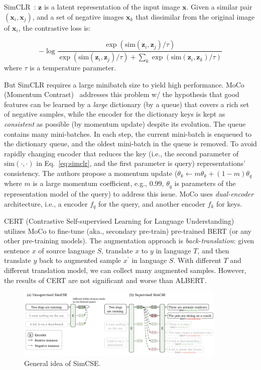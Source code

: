 SimCLR~: $\boldsymbol{z}$ is a latent representation of the input image $\boldsymbol{x}$. Given a similar pair $(\boldsymbol{x}_i, \boldsymbol{x}_j)$, and a set of negative images $\boldsymbol{x}_k$ that dissimilar from the original image of $\boldsymbol{x}_i$, the contrastive loss is:

\begin{equation} \label{eq:simclr}
	- \log \frac{\exp(\text{sim}(\boldsymbol{z}_i, \boldsymbol{z}_j)/\tau)}{\exp(\text{sim}(\boldsymbol{z}_i, \boldsymbol{z}_j)/\tau) + \sum_k \exp(\text{sim}(\boldsymbol{z}_i, \boldsymbol{z}_k)/\tau)}
\end{equation}
where $\tau$ is a temperature parameter.

But SimCLR requires a large minibatch size to yield high performance.
MoCo (Momentum Contrast)~ addresses this problem w/ the hypothesis that good features can be learned by a \emph{large} dictionary (by a queue) that covers a rich set of negative samples, while the encoder for the dictionary keys is kept as \emph{consistent} as possible (by momentum update) despite its evolution.
The queue contains many mini-batches.
In each step, the current mini-batch is enqueued to the dictionary queue, and the oldest mini-batch in the queue is removed.
To avoid rapidly changing encoder that reduces the key (i.e., the second parameter of $\text{sim}(\cdot, \cdot)$ in Eq.~\ref{eq:simclr}, and the first parameter is query) representations’ consistency.
The authors propose a momentum update ($\theta_k \leftarrow m\theta_k + (1 - m) \theta_q$ where $m$ is a large momentum coefficient, e.g., $0.99$, $\theta_q$ is parameters of the representation model of the query) to address this issue.
MoCo uses \emph{dual-encoder} architecture, i.e., a encoder $f_q$ for the query, and another encoder $f_k$ for keys.

CERT (Contrastive Self-supervised Learning for Language Understanding)~ utilizes MoCo to fine-tune (aka., secondary pre-train) pre-trained BERT (or any other pre-training models).
The augmentation approach is \emph{back-translation}: given sentence $x$ of source language $S$, translate $x$ to $y$ in language $T$, and then translate $y$ back to augmented sample $x^\prime$ in language $S$.
With different $T$ and different translation model, we can collect many augmented samples.
However, the results of CERT are not significant and worse than ALBERT.

\begin{figure}[!thp]
	\centerline{\includegraphics[width=10.0cm]{figs/SimCSE.png}}
	\caption{General idea of SimCSE.}
	\label{fig:SimCSE}
\end{figure}

